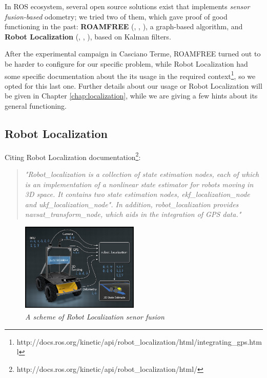 In \ac{ROS} ecosystem, several open source solutions exist that implements \textit{sensor fusion-based} odometry; we tried two of them, which gave proof of good functioning in the past: \textbf{ROAMFREE} (\cite{roamfreePaper}, \cite{roamfreeUtilizzo1}, \cite{roamfreeUtilizzo2}), a graph-based algorithm, and \textbf{Robot Localization} (\cite{robotLocalizationPaper}, \cite{robotLocalizationUtilizzo1}, \cite{robotLocalizationUtlizzo2}), based on Kalman filters.

After the experimental campaign in Casciano Terme, ROAMFREE turned out to be harder to configure for our specific problem, while Robot Localization had some specific documentation about the its usage in the required context\footnote{http://docs.ros.org/kinetic/api/robot\_localization/html/integrating\_gps.html},
so we opted for this last one. Further details about our usage or Robot Localization will be given in Chapter \ref{chap:localization}, while we are giving a few hints about its general functioning.

\subsection{Robot Localization}

Citing Robot Localization documentation\footnote{http://docs.ros.org/kinetic/api/robot\_localization/html/}:
\blockquote{\textit{"Robot\_localization is a collection of state estimation nodes, each of which is an implementation of a nonlinear state estimator for robots moving in 3D space. It contains two state estimation nodes, ekf\_localization\_node and ukf\_localization\_node". In addition, robot\_localization provides navsat\_transform\_node, which aids in the integration of GPS data."}}

\begin{figure}
	\centering
	\includegraphics[width=0.5\textwidth]{Images/background_and_tools/robotLocalizationLogo.png}
	\caption{\textit{A scheme of Robot Localization senor fusion}}
	\label{fig:robotLocalizationDisegno}
\end{figure}

